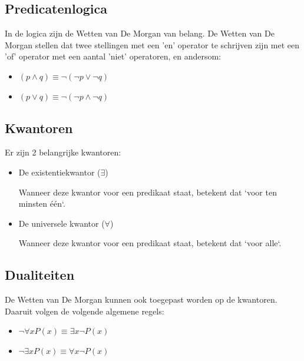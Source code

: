 \documentclass{article}
\begin{document}
		\subsection{Predicatenlogica}
		
		In de logica zijn de Wetten van De Morgan van belang. De Wetten van De Morgan stellen dat twee stellingen met een 'en' operator te schrijven zijn met een 'of' operator met een aantal 'niet' operatoren, en andersom:
	
		\begin{itemize}
			\item \( (p \land q) \equiv \neg(\neg p \lor \neg q) \)
			\item \( (p \lor q) \equiv \neg(\neg p \land \neg q) \)
		\end{itemize}
		
		\subsection{Kwantoren}
		
		Er zijn 2 belangrijke kwantoren:

		\begin{itemize}
			\item De existentiekwantor (\( \exists \))

			Wanneer deze kwantor voor een predikaat staat, betekent dat `voor ten minsten één`.

			\item De universele kwantor (\( \forall \))

			Wanneer deze kwantor voor een predikaat staat, betekent dat `voor alle`.
		\end{itemize}

		
		\subsection{Dualiteiten}
		
		De Wetten van De Morgan kunnen ook toegepast worden op de kwantoren. Daaruit volgen de volgende algemene regels:

		\begin{itemize}
			\item \( \neg \forall xP(x) \equiv \exists x \neg P(x) \)
			\item \( \neg \exists xP(x) \equiv \forall x \neg P(x) \)
		\end{itemize}
	
\end{document}
